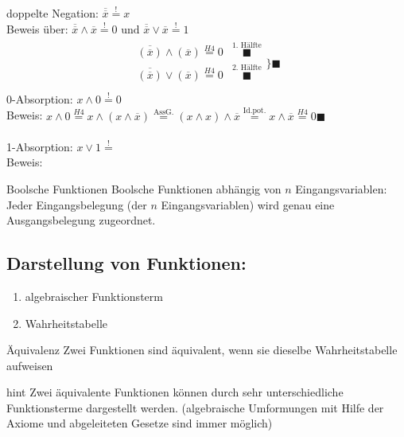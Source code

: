 \documentclass[10pt,a4paper]{scrartcl}
\begin{document}
\noindent
doppelte Negation: $ \overline{\overline{x}} \overset{!}{=} x $\\
Beweis über: $ \overline{\overline{x}} \wedge \overline{x} \overset{!}{=} 0 \text{ und }  \overline{\overline{x}} \vee \overline{x} \overset{!}{=} 1 $\\
\begin{align*}
\begin{array}{cc}
\overline{(\overline{x})} \wedge (\overline{x}) \overset{H4}{=} 0 & \overset{\text{1. Hälfte}}{\blacksquare}\\
\overline{(\overline{x})} \vee (\overline{x}) \overset{H4}{=} 0 & \overset{\text{2. Hälfte}}{\blacksquare}\\
\end{array}
\Bigg\} \blacksquare
\end{align*}
0-Absorption: $ x \wedge 0 \overset{!}{=} 0$\\
Beweis: $ x \wedge 0 \overset{H4}{=} x \wedge (x \wedge \overline{x})  \overset{\text{AssG.}}{=} (x \wedge x) \wedge \overline{x} \overset{\text{Id.pot.}}{=} x \wedge \overline{x} \overset{H4}{=} 0 \blacksquare$\\
\\
1-Absorption: $ x \vee 1 \overset{!}{=} $\\
Beweis: \\
\begin{Theorem}{Boolsche Funktionen}{}
Boolsche Funktionen abhängig von $ n $ Eingangsvariablen: Jeder Eingangsbelegung (der $ n $ Eingangsvariablen) wird genau eine Ausgangsbelegung zugeordnet.
\end{Theorem}

\subsection{Darstellung von Funktionen:}
\begin{enumerate}
	\item algebraischer Funktionsterm
	\item Wahrheitstabelle
\end{enumerate}

\begin{Theorem}{Äquivalenz}{}
	Zwei Funktionen sind äquivalent, wenn sie dieselbe Wahrheitstabelle aufweisen
\end{Theorem}

\begin{Hint}{}{hint}
	Zwei äquivalente Funktionen können durch sehr unterschiedliche Funktionsterme dargestellt werden. (algebraische Umformungen mit Hilfe der Axiome und abgeleiteten Gesetze sind immer möglich)
\end{Hint}
\end{document}
